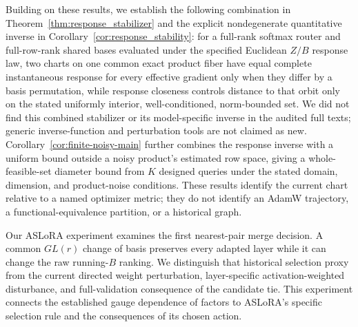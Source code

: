 Building on these results, we establish the
following combination in Theorem~\ref{thm:response_stabilizer} and the explicit
nondegenerate quantitative inverse in
Corollary~\ref{cor:response_stability}: for a full-rank softmax router and
full-row-rank shared bases evaluated under the specified Euclidean $Z/B$
response law,
two charts on one common exact product fiber have equal complete instantaneous
response for every effective gradient only when they differ by a basis
permutation, while response closeness controls distance to that orbit only on the stated uniformly
interior, well-conditioned, norm-bounded set.  We did not find this combined
stabilizer or its model-specific inverse in the audited full texts; generic
inverse-function and perturbation tools are not claimed as new.
Corollary~\ref{cor:finite-noisy-main} further combines the response inverse
with a uniform bound outside a noisy product's estimated row space, giving
a whole-feasible-set diameter bound from $K$ designed queries under the
stated domain, dimension, and product-noise conditions.  These results
identify the current chart relative to a named optimizer metric; they do not
identify an AdamW trajectory, a functional-equivalence partition, or a
historical graph.

Our ASLoRA experiment examines the first nearest-pair merge decision.  A common
$GL(r)$ change of basis preserves every adapted layer while it can change the
raw running-$B$ ranking.  We distinguish that historical selection proxy from
the current directed weight perturbation, layer-specific activation-weighted
disturbance, and full-validation consequence of the candidate tie.  This experiment connects the established gauge dependence of factors to
ASLoRA's specific selection rule and the consequences of its chosen action.

